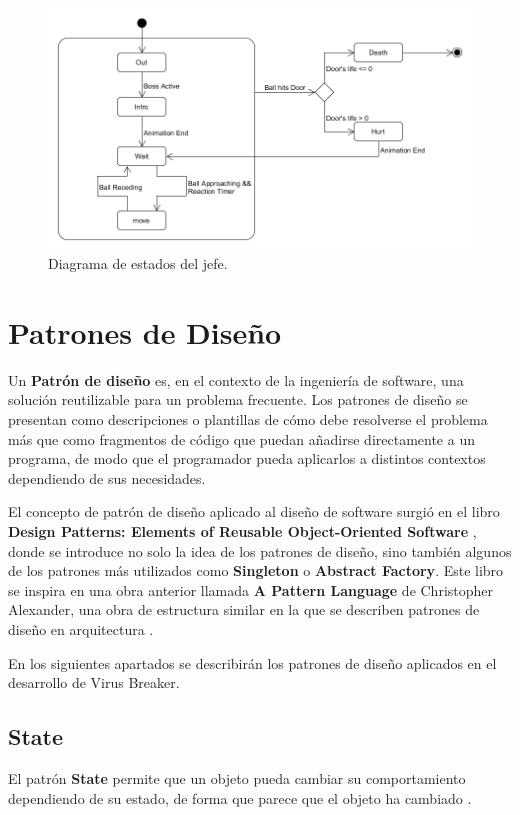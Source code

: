 \begin{figure}[h]
	\includegraphics[width=1\textwidth]{images/estructura/jefe/boss-estados}
	\centering
	\caption{Diagrama de estados del jefe.}
	\label{boss_states}
\end{figure}

\section{Patrones de Diseño}
Un \textbf{Patrón de diseño} es, en el contexto de la ingeniería de software, una solución reutilizable para un problema frecuente. Los patrones de diseño se presentan como descripciones o plantillas de cómo debe resolverse el problema más que como fragmentos de código que puedan añadirse directamente a un programa, de modo que el programador pueda aplicarlos a distintos contextos dependiendo de sus necesidades.

El concepto de patrón de diseño aplicado al diseño de software surgió en el libro \textbf{Design Patterns: Elements of Reusable Object-Oriented Software} \cite{design_patterns}, donde se introduce no solo la idea de los patrones de diseño, sino también algunos de los patrones más utilizados como \textbf{Singleton} o \textbf{Abstract Factory}. Este libro se inspira en una obra anterior llamada \textbf{A Pattern Language} de Christopher Alexander, una obra de estructura similar en la que se describen patrones de diseño en arquitectura \cite{game_programming_patterns}.

En los siguientes apartados se describirán los patrones de diseño aplicados en el desarrollo de Virus Breaker.

\subsection{State}
El patrón \textbf{State} permite que un objeto pueda cambiar su comportamiento dependiendo de su estado, de forma que parece que el objeto ha cambiado \cite{design_patterns}.

